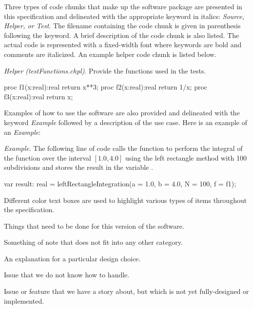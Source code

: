 \label{Notation}

Three types of code chunks that make up the software package are 
presented in this specification and delineated
with the appropriate keyword in italics: 
\textit{Source, Helper, or Test}.  The filename containing the code
chunk is given in parenthesis following the keyword. A brief description 
of the code chunk is also listed.
The actual code is represented with a fixed-width font where keywords are
bold and comments are italicized. An example helper code chunk is listed
below.

\textit{Helper (testFunctions.chpl)}. Provide the functions used
in the tests.
\begin{chapel}
  proc f1(x:real):real {
    return x**3;
  } 
  proc f2(x:real):real {
    return 1/x;
  } 
  proc f3(x:real):real {
    return x;
  } 
\end{chapel}

Examples of how to use the software are also provided and delineated with the
keyword \textit{Example} followed by a description of the use case. Here is
an example of an \textit{Example}:

\textit{Example}. The following line of code calls the function
 to perform the integral of the function 
over the interval $[1.0,4.0]$ using the left rectangle method with 100 subdivisions
and stores the result in the variable .
\begin{chapel}
  var result: real = leftRectangleIntegration(a = 1.0, b = 4.0, N = 100, f = f1);
\end{chapel}

Different color text boxes are used to highlight various types of items 
throughout the specification.

\begin{TODO}
  Things that need to be done for this version of the software.
\end{TODO}

\begin{note}
  Something of note that does not fit into any other category.
\end{note}

\begin{rationale}
  An explanation for a particular design choice.
\end{rationale}

\begin{openissue}
  Issue that we do not know how to handle.
\end{openissue}

\clearpage
\begin{future}
  Issue or feature that we have a story about, but which is not yet
  fully-designed or implemented. 
\end{future}
